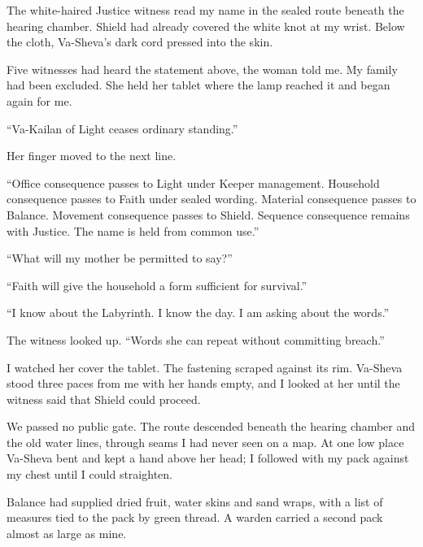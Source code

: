 
\ornament

The white-haired Justice witness read my name in the sealed route beneath the hearing chamber. Shield had already covered the white knot at my wrist. Below the cloth, Va-Sheva's dark cord pressed into the skin.\par

Five witnesses had heard the statement above, the woman told me. My family had been excluded. She held her tablet where the lamp reached it and began again for me.\par

``Va-Kailan of Light ceases ordinary standing.''\par

Her finger moved to the next line.\par

``Office consequence passes to Light under Keeper management. Household consequence passes to Faith under sealed wording. Material consequence passes to Balance. Movement consequence passes to Shield. Sequence consequence remains with Justice. The name is held from common use.''\par

``What will my mother be permitted to say?''\par

``Faith will give the household a form sufficient for survival.''\par

``I know about the Labyrinth. I know the day. I am asking about the words.''\par

The witness looked up. ``Words she can repeat without committing breach.''\par

I watched her cover the tablet. The fastening scraped against its rim. Va-Sheva stood three paces from me with her hands empty, and I looked at her until the witness said that Shield could proceed.\par

We passed no public gate. The route descended beneath the hearing chamber and the old water lines, through seams I had never seen on a map. At one low place Va-Sheva bent and kept a hand above her head; I followed with my pack against my chest until I could straighten.\par

Balance had supplied dried fruit, water skins and sand wraps, with a list of measures tied to the pack by green thread. A warden carried a second pack almost as large as mine.\par

